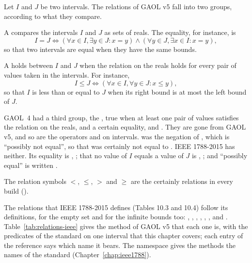 \documentclass[12pt,a4paper,twoside,openright]{book}
\begin{document}
Let $I$ and $J$ be two intervals. The relations of GAOL v5 fall into two
groups, according to what they compare.

\begin{Def}\label{def:relations-set}
A  compares the intervals $I$ and $J$ as sets of reals.
The equality, for instance, is
\begin{equation*}
I=J \Leftrightarrow(\forall x\in I, \exists y\in J\colon x=y)\wedge
                   (\forall y\in J, \exists x\in I\colon x=y),
\end{equation*}
so that two intervals are equal when they have the same bounds.
\end{Def}

\begin{Def}\label{def:relations-certainly}
A  holds between $I$ and $J$ when the relation on
the reals holds for every pair of values taken in the intervals. For
instance,
\begin{equation*}
I\leq J \Leftrightarrow(\forall x\in I, \forall y\in J\colon x\leq y),
\end{equation*}
so that $I$ is less than or equal to $J$ when its right bound is at most the
left bound of $J$.
\end{Def}

\begin{Rem}\label{rem:relations-possibly}
GAOL~4 had a third group, the , true when at least
one pair of values satisfies the relation on the reals, and a certain
equality,  and . They are gone
from GAOL v5, and so are the operators \code{==} and \code{!=} on
intervals.\newinvfive{}  was the negation of
, which is ``possibly not equal'', so that 
was certainly not equal to . IEEE 1788-2015 has neither. Its
equality is , ; that no value of $I$ equals a
value of $J$ is , ; and ``possibly
equal'' is written .
\end{Rem}
%

\medskip
The relation symbols $<$, $\leq$, $>$ and $\geq$ are the certainly relations
in every build ().

\medskip
The relations that IEEE 1788-2015 defines (Tables 10.3 and 10.4) follow its
definitions, for the empty set and for the infinite bounds
too:\newinvfive{} , , ,
, , ,  and
. Table~\ref{tab:relations-ieee} gives the method of GAOL
v5 that each one is, with the predicates of the standard on one interval
that this chapter covers; each entry of the reference says which name it
bears. The namespace  gives the methods the names of
the standard (Chapter~\ref{chap:ieee1788}).
%
\end{document}
